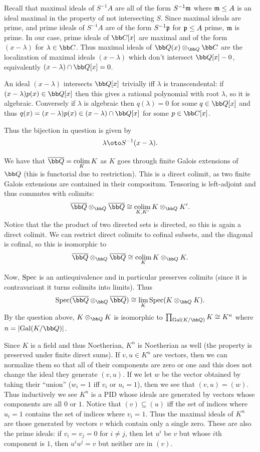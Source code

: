     Recall that maximal ideals of $S^{-1}A$ are all of the form $S^{-1}{{\frak m}}$ where ${{\frak m}}\leq A$ is an ideal maximal in the property of not intersecting $S$.
    Since maximal ideals are prime, and prime ideals of $S^{-1}A$ are of the form $S^{-1}{{\frak p}}$ for ${{\frak p}}\leq A$ prime, ${{\frak m}}$ is prime.
    In our case, prime ideals of $\bC[x]$ are maximal and of the form $(x-\lambda)$ for $\lambda\in\bC$.
    Thus maximal ideals of $\bQ(x)\otimes_\bQ\bC$ are the localization of maximal ideals $(x-\lambda)$ which don't intersect $\bQ[x]-0$, equivalently $(x-\lambda)\cap\bQ[x]=0$.

    An ideal $(x-\lambda)$ intersects $\bQ[x]$ trivially iff $\lambda$ is transcendental: if $(x-\lambda)p(x)\in\bQ[x]$ then this gives a rational polynomial with root $\lambda$,
    so it is algebraic.
    Conversely if $\lambda$ is algebraic then $q(\lambda)=0$ for some $q\in\bQ[x]$ and thus $q(x)=(x-\lambda)p(x)\in(x-\lambda)\cap\bQ[x]$ for some $p\in\bC[x]$.

    Thus the bijection in question is given by
    $$ \lambda \oto S^{-1}(x-\lambda) . $$

    \item We have that $\bar\bQ=\colim_KK$ as $K$ goes through finite Galois extensions of $\bQ$ (this is functorial due to restriction).
    This is a direct colimit, as two finite Galois extensions are contained in their compositum.
    Tensoring is left-adjoint and thus commutes with colimits:
    $$ \bar\bQ\otimes_\bQ\bar\bQ \cong \colim_{K,K'}K\otimes_\bQ K' . $$
    Notice that the the product of two directed sets is directed, so this is again a direct colimit.
    We can restrict direct colimits to cofinal subsets, and the diagonal is cofinal, so this is isomorphic to
    $$ \bar\bQ \otimes_\bQ \bar\bQ  \cong \colim_K K\otimes_\bQ K . $$

    Now, ${\rm Spec}$ is an antiequivalence and in particular preserves colimits (since it is contravariant it turns colimits into limits).
    Thus
    $$ \spec(\bar\bQ\otimes_\bQ\bar\bQ) \cong \lim_K \spec(K\otimes_\bQ K) . $$
    By the question above, $K\otimes_\bQ K$ is isomorphic to $\prod_{\Gal(K/\bQ)}K\cong K^n$ where $n=\abs{\Gal(K/\bQ)}$.

    Since $K$ is a field and thus Noetherian, $K^n$ is Noetherian as well (the property is preserved under finite direct sums).
    If $v,u\in K^n$ are vectors, then we can normalize them so that all of their components are zero or one and this does not change the ideal they generate $(v,u)$.
    If we let $w$ be the vector obtained by taking their ``union'' ($w_i=1$ iff $v_i$ or $u_i=1$), then we see that $(v,u)=(w)$.
    Thus inductively we see $K^n$ is a PID whose ideals are generated by vectors whose components are all $0$ or $1$.
    Notice that $(v)\subseteq(u)$ iff the set of indices where $u_i=1$ contains the set of indices where $v_i=1$.
    Thus the maximal ideals of $K^n$ are those generated by vectors $v$ which contain only a single zero.
    These are also the prime ideals: if $v_i=v_j=0$ for $i\neq j$, then let $u^i$ be $v$ but whose $i$th component is $1$, then $u^iu^j=v$ but neither are in $(v)$.


